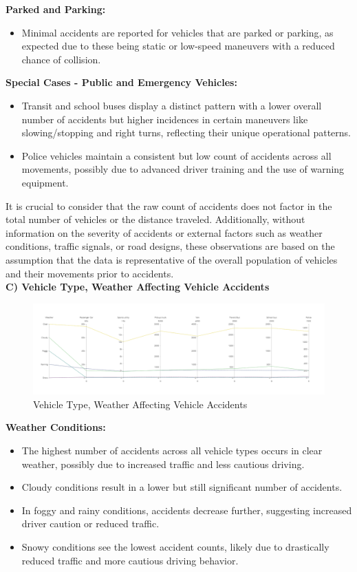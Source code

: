 \documentclass[conference]{IEEEtran}
\begin{document}
\begin{enumerate}
\textbf{Parked and Parking:}
\begin{itemize}
    \item Minimal accidents are reported for vehicles that are parked or parking, as expected due to these being static or low-speed maneuvers with a reduced chance of collision.
\end{itemize}

\textbf{Special Cases - Public and Emergency Vehicles:}
\begin{itemize}
    \item Transit and school buses display a distinct pattern with a lower overall number of accidents but higher incidences in certain maneuvers like slowing/stopping and right turns, reflecting their unique operational patterns.
    \item Police vehicles maintain a consistent but low count of accidents across all movements, possibly due to advanced driver training and the use of warning equipment.
\end{itemize}

It is crucial to consider that the raw count of accidents does not factor in the total number of vehicles or the distance traveled. Additionally, without information on the severity of accidents or external factors such as weather conditions, traffic signals, or road designs, these observations are based on the assumption that the data is representative of the overall population of vehicles and their movements prior to accidents.\\

\textbf{C) Vehicle Type, Weather Affecting Vehicle Accidents}

\begin{figure}
    \centering
    \includegraphics[width=1\linewidth]{newplot (3).png}
    \caption{Vehicle Type, Weather Affecting Vehicle Accidents}
    
\end{figure}

\textbf{Weather Conditions:}
\begin{itemize}
    \item The highest number of accidents across all vehicle types occurs in clear weather, possibly due to increased traffic and less cautious driving.
    \item Cloudy conditions result in a lower but still significant number of accidents.
    \item In foggy and rainy conditions, accidents decrease further, suggesting increased driver caution or reduced traffic.
    \item Snowy conditions see the lowest accident counts, likely due to drastically reduced traffic and more cautious driving behavior.
\end{itemize}


\end{enumerate}
\end{document}
